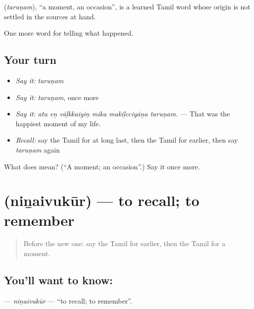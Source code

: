 \begin{cousinweb}
\textbf{} (\emph{taruṇam}), \textquotedblleft{}a moment, an occasion\textquotedblright{}, is a learned Tamil word whose origin is not settled in the sources at hand.
\end{cousinweb}

\begin{grammarlens}[title={What you've built}]
One more word for telling what happened.
\end{grammarlens}

\subsection*{Your turn}
\begin{itemize}
\raggedright
  \item \emph{Say it:} \emph{taruṇam}
  \item \emph{Say it:} \emph{taruṇam}, once more
  \item \emph{Say it:} \emph{atu eṉ vāḻkkaiyiṉ mika makiḻcciyāṉa taruṇam.} — That was the happiest moment of my life.
  \item \emph{Recall:} say the Tamil for at long last, then the Tamil for earlier, then say \emph{taruṇam} again
\end{itemize}

\begin{tcolorbox}[breakable,colback=teal!4,colframe=teal!35!black,title={Before you move on}]
What does  mean? (\textquotedblleft{}A moment; an occasion\textquotedblright{}.) Say it once more.
\end{tcolorbox}
\section[\texorpdfstring{\ta{நினைவுகூர்} (niṉaivukūr)}{நினைவுகூர் (niṉaivukūr)}]{ (niṉaivukūr) — to recall; to remember}

\label{lesson:TA-C314-ninaivukur}



\begin{quote}
Before the new one: say the Tamil for earlier, then the Tamil for a moment.
\end{quote}

\subsection*{You'll want to know: }
\textbf{} — \emph{niṉaivukūr} — \textquotedblleft{}to recall; to remember\textquotedblright{}.

